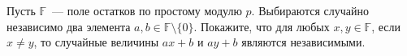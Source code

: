 Пусть $\mathbb{F}$~--- поле остатков по простому модулю $p$. Выбираются случайно независимо два элемента $a, b \in \mathbb{F}
\setminus \{0\}$. Покажите, что для любых $x, y \in \mathbb{F}$, если $x \neq y$, то случайные величины $ax + b$ и $ay + b$
являются независимыми.

